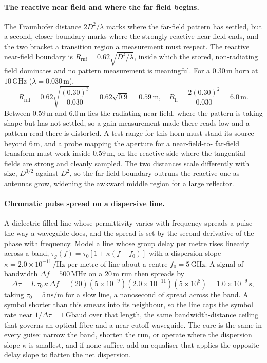 \paragraph{The reactive near field and where the far field begins.}
The Fraunhofer distance $2D^2/\lambda$ marks where the far-field pattern
has settled, but a second, closer boundary marks where the strongly
reactive near field ends, and the two bracket a transition region a
measurement must respect. The reactive near-field boundary is
$R_{\text{rnf}} = 0.62\sqrt{D^3/\lambda}$, inside which the stored,
non-radiating field dominates and no pattern measurement is meaningful.
For a $0.30\,\si{\meter}$ horn at $10\,\si{\giga\hertz}$ ($\lambda =
0.030\,\si{\meter}$),
\[
R_{\text{rnf}} = 0.62\sqrt{\frac{(0.30)^3}{0.030}} = 0.62\sqrt{0.9} =
0.59\,\si{\meter}, \quad R_{\text{ff}} = \frac{2(0.30)^2}{0.030} =
6.0\,\si{\meter}.
\]
Between $0.59\,\si{\meter}$ and $6.0\,\si{\meter}$ lies the radiating
near field, where the pattern is taking shape but has not settled, so a
gain measurement made there reads low and a pattern read there is
distorted. A test range for this horn must stand its source beyond
$6\,\si{\meter}$, and a probe mapping the aperture for a near-field-to-
far-field transform must work inside $0.59\,\si{\meter}$, on the reactive
side where the tangential fields are strong and cleanly sampled. The two
distances scale differently with size, $D^{3/2}$ against $D^2$, so the
far-field boundary outruns the reactive one as antennas grow, widening the
awkward middle region for a large reflector.

\paragraph{Chromatic pulse spread on a dispersive line.}
A dielectric-filled line whose permittivity varies with frequency spreads a
pulse the way a waveguide does, and the spread is set by the second
derivative of the phase with frequency. Model a line whose group delay per
metre rises linearly across a band, $\tau_g(f) = \tau_0[1 + \kappa(f-f_0)]$
with a dispersion slope $\kappa = 2.0\times 10^{-11}\,\si{\per\hertz}$ per
metre of line about a centre $f_0 = 5\,\si{\giga\hertz}$. A signal of
bandwidth $\Delta f = 500\,\si{\mega\hertz}$ on a $20\,\si{\meter}$ run
then spreads by
\[
\Delta\tau = L\,\tau_0\,\kappa\,\Delta f = (20)(5\times 10^{-9})
(2.0\times 10^{-11})(5\times 10^{8}) = 1.0\times 10^{-9}\,\si{\second},
\]
taking $\tau_0 = 5\,\si{\nano\second\per\meter}$ for a slow line, a
nanosecond of spread across the band. A symbol shorter than this smears
into its neighbour, so the line caps the symbol rate near $1/\Delta\tau =
1\,\text{Gbaud}$ over that length, the same bandwidth-distance ceiling
that governs an optical fibre and a near-cutoff waveguide. The cure is the
same in every guise: narrow the band, shorten the run, or operate where the
dispersion slope $\kappa$ is smallest, and if none suffice, add an
equaliser that applies the opposite delay slope to flatten the net
dispersion.

